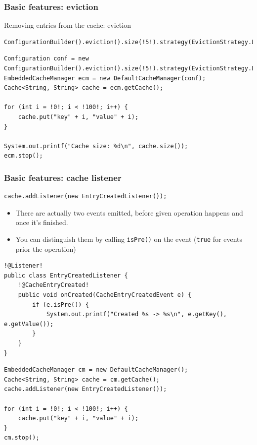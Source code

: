 \documentclass[10pt,utf8]{beamer}
\begin{document}
\begin{frame}[fragile]
	\frametitle{Basic features: eviction}
	Removing entries from the cache: eviction
	\begin{lstlisting}[style=Java]
	ConfigurationBuilder().eviction().size(!5!).strategy(EvictionStrategy.LRU)
	\end{lstlisting}
	
	\begin{lstlisting}[style=Java]
Configuration conf = new ConfigurationBuilder().eviction().size(!5!).strategy(EvictionStrategy.LIRS).build();
EmbeddedCacheManager ecm = new DefaultCacheManager(conf);
Cache<String, String> cache = ecm.getCache();

for (int i = !0!; i < !100!; i++) {
    cache.put("key" + i, "value" + i);
}

System.out.printf("Cache size: %d\n", cache.size());
ecm.stop();
	\end{lstlisting}
\end{frame}

\begin{frame}[fragile]
	\frametitle{Basic features: cache listener}
	\begin{lstlisting}[style=Java]
cache.addListener(new EntryCreatedListener());
	\end{lstlisting}
	\begin{itemize}
		\item There are actually two events emitted, before given operation happens and once it's finished.
		\item You can distinguish them by calling \texttt{isPre()} on the event (\texttt{true} for events prior the operation)
	\end{itemize}
\end{frame}

\begin{frame}[fragile]
	\begin{lstlisting}[style=Java]
!@Listener!
public class EntryCreatedListener {
    !@CacheEntryCreated!
    public void onCreated(CacheEntryCreatedEvent e) {
        if (e.isPre()) {
            System.out.printf("Created %s -> %s\n", e.getKey(), e.getValue());
        }
    }
}
	\end{lstlisting}
	\begin{lstlisting}[style=Java]
EmbeddedCacheManager cm = new DefaultCacheManager();
Cache<String, String> cache = cm.getCache();
cache.addListener(new EntryCreatedListener());

for (int i = !0!; i < !100!; i++) {
    cache.put("key" + i, "value" + i);
}
cm.stop();
	\end{lstlisting}
\end{frame}
\end{document}
